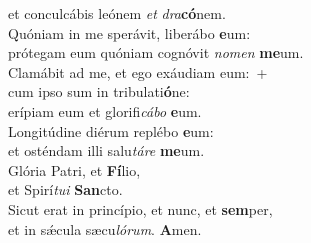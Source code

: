 \oddverse et conculcábis leónem \textit{et} \textit{dra}\textbf{có}nem.\\
\evenverse Quóniam in me sperávit, liberábo \textbf{e}um:~\*\\
\evenverse prótegam eum quóniam cognóvit \textit{no}\textit{men} \textbf{me}um.\\
\oddverse Clamábit ad me, et ego exáudiam eum:~+\\
\oddverse  cum ipso sum in tribulati\textbf{ó}ne:~\*\\
\oddverse erípiam eum et glorifi\textit{cá}\textit{bo} \textbf{e}um.\\
\evenverse Longitúdine diérum replébo \textbf{e}um:~\*\\
\evenverse et osténdam illi salu\textit{tá}\textit{re} \textbf{me}um.\\
\oddverse Glória Patri, et \textbf{Fí}lio,~\*\\
\oddverse et Spirí\textit{tu}\textit{i} \textbf{San}cto.\\
\evenverse Sicut erat in princípio, et nunc, et \textbf{sem}per,~\*\\
\evenverse et in sǽcula sæcu\textit{ló}\textit{rum}. \textbf{A}men.\\
